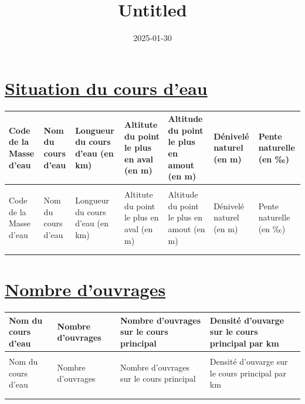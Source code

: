 \documentclass[
]{article}
\title{Untitled}
\author{}
\date{\vspace{-2.5em}2025-01-30}
\begin{document}
\maketitle

{
\setcounter{tocdepth}{2}
\tableofcontents
}
\hypertarget{situation-du-cours-deau}{%
\section{\texorpdfstring{\ul{Situation du cours
d'eau}}{Situation du cours d'eau}}\label{situation-du-cours-deau}}

\begin{longtable}[l]{>{\raggedleft\arraybackslash}p{2cm}>{\raggedleft\arraybackslash}p{2cm}>{\raggedleft\arraybackslash}p{2cm}>{\raggedleft\arraybackslash}p{2cm}>{\raggedleft\arraybackslash}p{2cm}>{\raggedleft\arraybackslash}p{2cm}>{\raggedleft\arraybackslash}p{2cm}}
\toprule
Code de la Masse d'eau & Nom du cours d'eau & Longueur du cours d'eau (en km) & Altitute du point le plus en aval (en m) & Altitude du point le plus en amout (en m) & Dénivelé naturel (en m) & Pente naturelle (en ‰)\\
\midrule
\endfirsthead
\multicolumn{7}{@{}l}{\textit{(continued)}}\\
\toprule
Code de la Masse d'eau & Nom du cours d'eau & Longueur du cours d'eau (en km) & Altitute du point le plus en aval (en m) & Altitude du point le plus en amout (en m) & Dénivelé naturel (en m) & Pente naturelle (en ‰)\\
\midrule
\endhead

\endfoot
\bottomrule
\endlastfoot
\cellcolor{gray!15}{FRHR163 - FRHR162} & \cellcolor{gray!15}{la béthune} & \cellcolor{gray!15}{64.39} & \cellcolor{gray!15}{3.54} & \cellcolor{gray!15}{203.7} & \cellcolor{gray!15}{200.16} & \cellcolor{gray!15}{3.11}\\*
\end{longtable}

\hypertarget{nombre-douvrages}{%
\section{\texorpdfstring{\ul{Nombre
d'ouvrages}}{Nombre d'ouvrages}}\label{nombre-douvrages}}

\begin{longtable}[l]{>{\raggedleft\arraybackslash}p{4cm}>{\raggedleft\arraybackslash}p{4cm}>{\raggedleft\arraybackslash}p{4cm}>{\raggedleft\arraybackslash}p{4cm}}
\toprule
Nom du cours d'eau & Nombre d'ouvrages & Nombre d'ouvrages sur le cours principal & Densité d'ouvarge sur le cours principal par km\\
\midrule
\endfirsthead
\multicolumn{4}{@{}l}{\textit{(continued)}}\\
\toprule
Nom du cours d'eau & Nombre d'ouvrages & Nombre d'ouvrages sur le cours principal & Densité d'ouvarge sur le cours principal par km\\
\midrule
\endhead

\endfoot
\bottomrule
\endlastfoot
\cellcolor{gray!15}{la béthune} & \cellcolor{gray!15}{34} & \cellcolor{gray!15}{20} & \cellcolor{gray!15}{0.31}\\*
\end{longtable}
\end{document}

